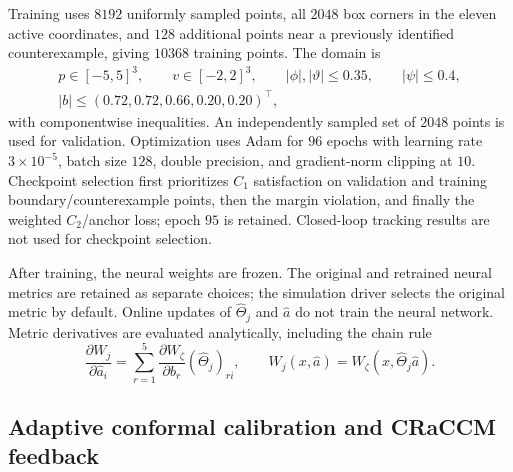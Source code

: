 \documentclass[11pt]{article}
\begin{document}
Training uses $8192$ uniformly sampled points, all $2048$ box corners
in the eleven active coordinates, and $128$
additional points near a previously identified counterexample, giving
$10368$ training points. The domain is
\begin{equation}
\begin{gathered}
    p\in[-5,5]^3,\qquad v\in[-2,2]^3,\qquad
    |\phi|,|\vartheta|\le0.35,\qquad |\psi|\le0.4,\\
    |b|\le(0.72,0.72,0.66,0.20,0.20)^\top,
\end{gathered}
\end{equation}
with componentwise inequalities. An independently sampled set of
$2048$ points is used for validation. Optimization uses Adam for
$96$ epochs with learning rate $3\times10^{-5}$, batch size $128$,
double precision, and gradient-norm clipping at $10$.
Checkpoint selection first prioritizes $C_1$ satisfaction on validation
and training boundary/counterexample points, then the margin violation,
and finally the weighted $C_2$/anchor loss; epoch $95$ is retained.
Closed-loop tracking results are not used for checkpoint selection.

After training, the neural weights are frozen. The original and retrained
neural metrics are retained as separate choices; the simulation driver
selects the original metric by default. Online updates of
$\hat\Theta_j$ and $\hat a$ do not train the neural network.
Metric derivatives are evaluated analytically, including the chain rule
\begin{equation}
    \frac{\partial W_j}{\partial\hat a_i}
    =\sum_{r=1}^{5}\frac{\partial W_\zeta}{\partial b_r}
      (\hat\Theta_j)_{ri},\qquad
    W_j(x,\hat a)=W_\zeta(x,\hat\Theta_j\hat a).
\end{equation}

\subsection{Adaptive conformal calibration and CRaCCM feedback}
\end{document}

